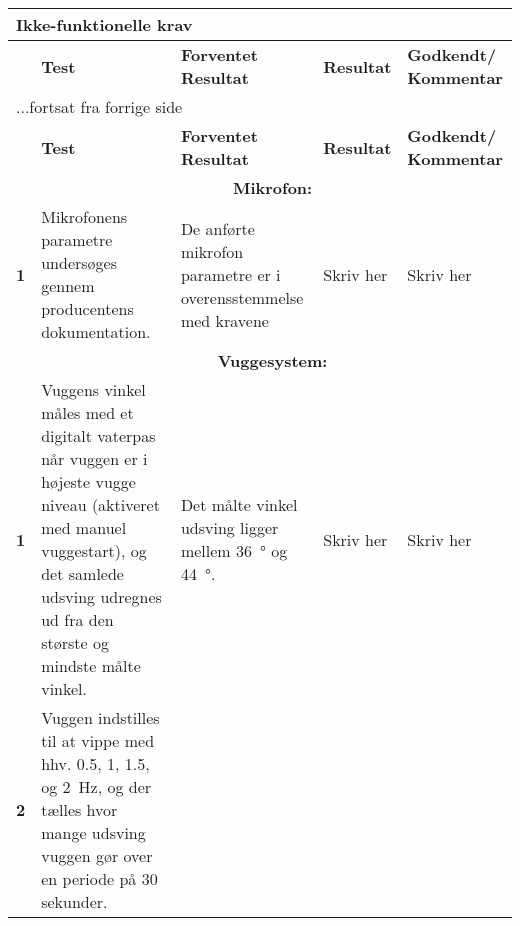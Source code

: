 \begin{center}
\label{accepttest:ikkefunktionellekrav} 
\begin{longtable}{|p{}|p{}|p{}|p{}|p{}|} %
\hline
\multicolumn{5}{|l|}{\textbf{Ikke-funktionelle krav}} \\ \hline
\multicolumn{1}{|c|}{} &
\textbf{Test} &
\textbf{Forventet \newline Resultat} &
\textbf{Resultat} &
\textbf{Godkendt/ \newline Kommentar} \\ \hline 
\endfirsthead

\multicolumn{5}{l}{...fortsat fra forrige side} \\ \hline 
\multicolumn{1}{|c|}{} &
\textbf{Test} &
\textbf{Forventet \newline Resultat} &
\textbf{Resultat} &
\textbf{Godkendt/ \newline Kommentar} \\ \hline 
\endhead




&\multicolumn{4}{|c|}{\textbf{Mikrofon:}} \\ \hline

\textbf{1}	&Mikrofonens parametre undersøges gennem producentens dokumentation.

			&De anførte mikrofon parametre er i overensstemmelse med kravene
			
			&Skriv her
			&Skriv her 
			\\ \hline

&\multicolumn{4}{|c|}{\textbf{Vuggesystem:}} \\ \hline

\textbf{1}	&Vuggens vinkel måles med et digitalt vaterpas når vuggen er i højeste vugge niveau (aktiveret med manuel vuggestart), og det samlede udsving udregnes ud fra den største og mindste målte vinkel.

			&Det målte vinkel udsving ligger mellem \SI{36}{\degree} og \SI{44}{\degree}.
			
			&Skriv her
			&Skriv her 
			\\\hline
			 
			 
\textbf{2}	&Vuggen indstilles til at vippe med hhv. 0.5, 1, 1.5, og \SI{2}{\hertz}, og der tælles hvor mange udsving vuggen gør over en periode på 30 sekunder. 


\end{longtable}
\end{center}
